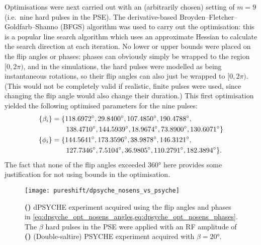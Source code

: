 Optimisations were next carried out with an (arbitrarily chosen) setting of $m = 9$ (i.e.\ nine hard pulses in the PSE).
The derivative-based Broyden--Fletcher--Goldfarb--Shanno (BFGS) algorithm was used to carry out the optimisation: this is a popular line search algorithm which uses an approximate Hessian to calculate the search direction at each iteration.\autocite{Kelley1999,Nocedal2006}
No lower or upper bounds were placed on the flip angles or phases: phases can obviously simply be wrapped to the region $[0, 2\pi)$, and in the simulations, the hard pulses were modelled as being instantaneous rotations, so their flip angles can also just be wrapped to $[0, 2\pi)$.
(This would not be completely valid if realistic, finite pulses were used, since changing the flip angle would also change their duration.)
This first optimisation yielded the following optimised parameters for the nine pulses:
\begin{align}
    \{\beta_i\} &= \{\ang{118.6972}, \ang{29.8400}, \ang{107.4850}, \ang{190.4788}, \notag \\
                &\qquad \ang{138.4710}, \ang{144.5939}, \ang{18.9674}, \ang{73.8900}, \ang{130.6071}\} \label{eq:dpsyche_opt_nosens_angles} \\
     \{\phi_i\} &= \{\ang{144.5641}, \ang{173.3596}, \ang{38.9878}, \ang{146.3121}, \notag \\
                &\qquad \ang{127.7346}, \ang{7.5104}, \ang{36.9805}, \ang{110.2791}, \ang{182.3894}\}. \label{eq:dpsyche_opt_nosens_phases}
\end{align}
The fact that none of the flip angles exceeded \ang{360} here provides some justification for not using bounds in the optimisation.

\begin{figure}[htb]
    \centering
    \texttt{[image: pureshift/dpsyche\_nosens\_vs\_psyche]}
    {\label{fig:dpsyche_nosens_vs_psyche_dp}}
    {\label{fig:dpsyche_nosens_vs_psyche_p}}
    \caption[Comparison of optimised dPSYCHE and PSYCHE]{
        \textbf{()} dPSYCHE experiment acquired using the flip angles and phases in \cref{eq:dpsyche_opt_nosens_angles,eq:dpsyche_opt_nosens_phases}.
        The $\beta$ hard pulses in the PSE were applied with an RF amplitude of 
        \textbf{()} (Double-saltire) PSYCHE experiment acquired with $\beta = \ang{20}$.
    }
    \label{fig:dpsyche_nosens_vs_psyche}
\end{figure}

